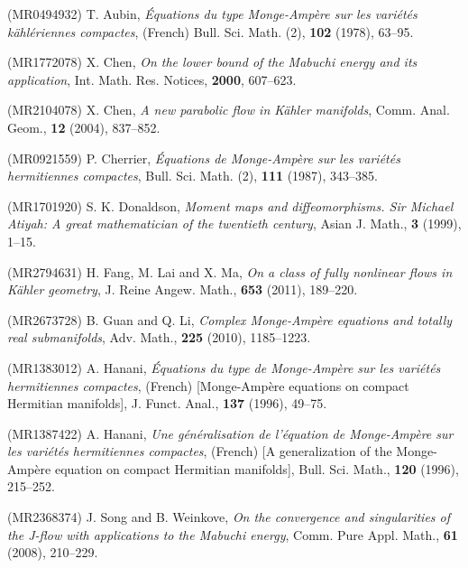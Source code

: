 \documentclass[12pt]{amsart}
\theoremstyle{definition}
\numberwithin{equation}{section}
\begin{document}
\begin{thebibliography}{99}

 (MR0494932)
 \newblock T. Aubin,
 \newblock \emph{\'Equations du type Monge-Amp\`ere sur les vari\'et\'es k\"ahl\'eriennes compactes}, (French)
\newblock Bull. Sci. Math. (2), \textbf{102} (1978), 63--95.

 (MR1772078)
\newblock X. Chen,
\newblock \emph{On the lower bound of the Mabuchi energy and its application},
\newblock Int. Math. Res. Notices, \textbf{2000}, 607--623.

 (MR2104078)
\newblock X. Chen,
\newblock \emph{A new parabolic flow in K\"ahler manifolds},
\newblock Comm. Anal. Geom., \textbf{12} (2004), 837--852.

 (MR0921559)
\newblock P. Cherrier,
\newblock \emph{\'Equations de Monge-Amp\`ere sur les vari\'et\'es hermitiennes compactes},
\newblock Bull. Sci. Math. (2), \textbf{111} (1987), 343--385.

 (MR1701920)
\newblock S. K. Donaldson,
\newblock \emph{Moment maps and diffeomorphisms. Sir Michael Atiyah: A great mathematician of the twentieth century},
\newblock Asian J. Math., \textbf{3} (1999), 1--15.

 (MR2794631)
\newblock H. Fang, M. Lai and X. Ma,
\newblock \emph{On a class of fully nonlinear flows in K\"ahler geometry},
\newblock J. Reine Angew. Math., \textbf{653} (2011), 189--220.

 (MR2673728)
\newblock B. Guan and Q. Li,
\newblock \emph{Complex Monge-Amp\`ere equations and totally real submanifolds},
\newblock Adv. Math., \textbf{225} (2010), 1185--1223.

 (MR1383012)
\newblock A. Hanani,
\newblock \emph{\'Equations du type
 de Monge-Amp\`ere sur les vari\'et\'es hermitiennes compactes},
(French) [Monge-Amp\`ere equations on compact Hermitian manifolds],
\newblock J. Funct. Anal., \textbf{137} (1996), 49--75.

 (MR1387422)
\newblock A. Hanani,
\newblock \emph{Une g\'en\'eralisation de l'\'equation de Monge-Amp\`ere sur les
vari\'et\'es hermitiennes compactes},
(French) [A generalization of the Monge-Amp\`ere equation on compact Hermitian
manifolds],
 \newblock Bull. Sci. Math., \textbf{120} (1996), 215--252.

 (MR2368374)
\newblock J. Song and B. Weinkove,
\newblock \emph{On the convergence and singularities of the J-flow with applications to the Mabuchi energy},
\newblock Comm. Pure Appl. Math., \textbf{61} (2008), 210--229.


\end{thebibliography}
\end{document}
